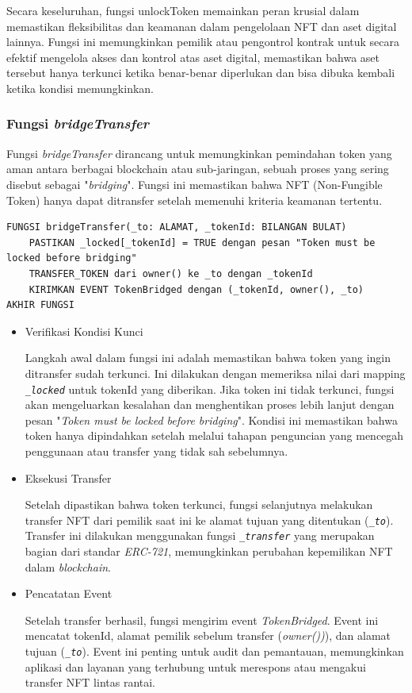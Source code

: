 Secara keseluruhan, fungsi unlockToken memainkan peran krusial dalam memastikan fleksibilitas dan keamanan dalam pengelolaan NFT dan aset digital lainnya. Fungsi ini memungkinkan pemilik atau pengontrol kontrak untuk secara efektif mengelola akses dan kontrol atas aset digital, memastikan bahwa aset tersebut hanya terkunci ketika benar-benar diperlukan dan bisa dibuka kembali ketika kondisi memungkinkan.

\subsubsection{Fungsi \emph{bridgeTransfer}}
Fungsi \emph{bridgeTransfer} dirancang untuk memungkinkan pemindahan token yang aman antara berbagai blockchain atau sub-jaringan, sebuah proses yang sering disebut sebagai "\emph{bridging}". Fungsi ini memastikan bahwa NFT (Non-Fungible Token) hanya dapat ditransfer setelah memenuhi kriteria keamanan tertentu.

\begin{lstlisting}[caption=Fungsi bridgeTransfer]
FUNGSI bridgeTransfer(_to: ALAMAT, _tokenId: BILANGAN BULAT)
    PASTIKAN _locked[_tokenId] = TRUE dengan pesan "Token must be locked before bridging"
    TRANSFER_TOKEN dari owner() ke _to dengan _tokenId
    KIRIMKAN EVENT TokenBridged dengan (_tokenId, owner(), _to)
AKHIR FUNGSI
\end{lstlisting}

\begin{itemize}
    \item Verifikasi Kondisi Kunci
    
    Langkah awal dalam fungsi ini adalah memastikan bahwa token yang ingin ditransfer sudah terkunci. Ini dilakukan dengan memeriksa nilai dari mapping \emph{\texttt{\_locked}} untuk tokenId yang diberikan. Jika token ini tidak terkunci, fungsi akan mengeluarkan kesalahan dan menghentikan proses lebih lanjut dengan pesan "\emph{Token must be locked before bridging}". Kondisi ini memastikan bahwa token hanya dipindahkan setelah melalui tahapan penguncian yang mencegah penggunaan atau transfer yang tidak sah sebelumnya.

    \item Eksekusi Transfer
    
    Setelah dipastikan bahwa token terkunci, fungsi selanjutnya melakukan transfer NFT dari pemilik saat ini ke alamat tujuan yang ditentukan (\emph{\texttt{\_to}}). Transfer ini dilakukan menggunakan fungsi \emph{\texttt{\_transfer}} yang merupakan bagian dari standar \emph{ERC-721}, memungkinkan perubahan kepemilikan NFT dalam \emph{blockchain}.

    \item Pencatatan Event
    
    Setelah transfer berhasil, fungsi mengirim event \emph{TokenBridged}. Event ini mencatat tokenId, alamat pemilik sebelum transfer (\emph{owner())}), dan alamat tujuan (\emph{\texttt{\_to}}). Event ini penting untuk audit dan pemantauan, memungkinkan aplikasi dan layanan yang terhubung untuk merespons atau mengakui transfer NFT lintas rantai.
\end{itemize}

